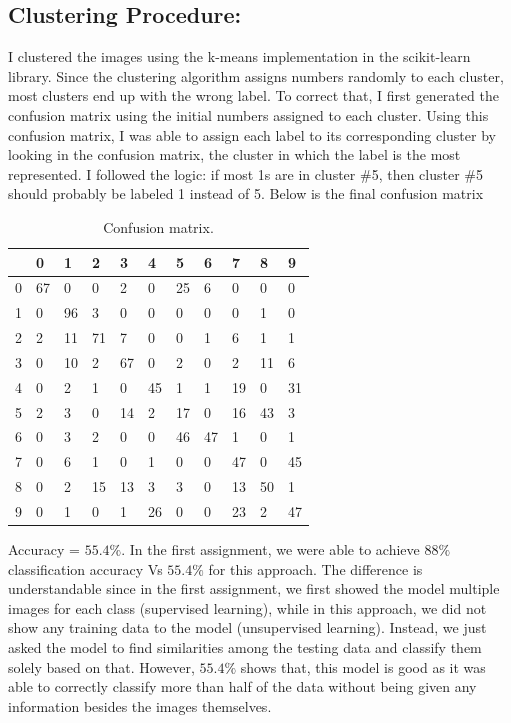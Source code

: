 \documentclass[12pt]{article}
\begin{document}
		\subsection*{Clustering Procedure:}
			I clustered the images using the k-means implementation in the scikit-learn library. Since the clustering algorithm assigns numbers randomly to each cluster, most clusters end up with the wrong label. To correct that, I first generated the confusion matrix using the initial numbers assigned to each cluster. Using this confusion matrix, I was able to assign each label to its corresponding cluster by looking in the confusion matrix, the cluster in which the label is the most represented. I followed the logic: if most 1s are in cluster \#5, then cluster \#5 should probably be labeled 1 instead of 5.
			Below is the final confusion matrix  
		\begin{table}[h]
			\centering
			\caption{Confusion matrix.}
			\label{tab:my-table}
			\begin{tabular}{l|llllllllll}
				& 0  & 1  & 2  & 3  & 4  & 5  & 6  & 7  & 8  & 9  \\ \hline
				0 & 67 & 0  & 0  & 2  & 0  & 25 & 6  & 0  & 0  & 0  \\
				1 & 0  & 96 & 3  & 0  & 0  & 0  & 0  & 0  & 1  & 0  \\
				2 & 2  & 11 & 71 & 7  & 0  & 0  & 1  & 6  & 1  & 1  \\
				3 & 0  & 10 & 2  & 67 & 0  & 2  & 0  & 2  & 11 & 6  \\
				4 & 0  & 2  & 1  & 0  & 45 & 1  & 1  & 19 & 0  & 31 \\
				5 & 2  & 3  & 0  & 14 & 2  & 17 & 0  & 16 & 43 & 3  \\
				6 & 0  & 3  & 2  & 0  & 0  & 46 & 47 & 1  & 0  & 1  \\
				7 & 0  & 6  & 1  & 0  & 1  & 0  & 0  & 47 & 0  & 45 \\
				8 & 0  & 2  & 15 & 13 & 3  & 3  & 0  & 13 & 50 & 1  \\
				9 & 0  & 1  & 0  & 1  & 26 & 0  & 0  & 23 & 2  & 47
			\end{tabular}
		\end{table}
	
		Accuracy = $55.4 \%$.
		In the first assignment, we were able to achieve $88\%$ classification accuracy Vs $55.4\%$ for this approach. The difference is understandable since in the first assignment, we first showed the model multiple images for each class (supervised learning), while in this approach, we did not show any training data to the model (unsupervised learning). Instead, we just asked the model to find similarities among the testing data and classify them solely based on that. However, $55.4\%$ shows that, this model is good as it was able to correctly classify more than half of the data without being given any information besides the images themselves.
		
\end{document}
